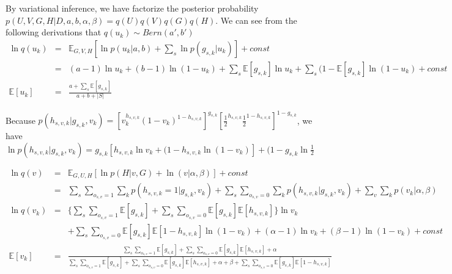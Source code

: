 \documentclass[11pt]{report}
\newcommand{\Ep}{\mathbb{E}}
\begin{document}
By variational inference, we have factorize the posterior probability $p(U,V,G,H|D,a,b,\alpha,\beta )=q(U)q(V)q(G)q(H)$. We can see from the following derivations that $q(u_k)\sim Bern(a',b')$
\begin{eqnarray*}
\ln q(u_k) & = & \mathbb{E}_{G,V,H} [\ln p(u_k|a,b)+\sum_s \ln p(g_{s,k}|u_k)]+const\\
&=&(a-1)\ln u_k +(b-1) \ln (1-u_k) + \sum_{s} \mathbb{E}[g_{s,k}] \ln u_k + \sum_s (1-\mathbb{E}[g_{s,k}] \ln (1-u_k) + const \\
\mathbb{E}[u_k] &=& \frac{a+\sum_{s} \mathbb{E}[g_{s,k}] }{a+b+ |S|  }
\end{eqnarray*}

Because $p(h_{s,v,k}|g_{s,k},v_k)=[v_k^{h_{s,v,k}} (1-v_k)^{1-h_{s,v,k}}]^{g_{s,k}} [\frac{1}{2}^{h_{s,v,k}} \frac{1}{2}^{1-h_{s,v,k}}]^{1-g_{s,k}}$, we have $\ln p(h_{s,v,k}|g_{s,k},v_k)= g_{s,k} [h_{s,v,k}\ln v_k + (1-h_{s,v,k}\ln (1-v_k)] + (1-g_{s,k}\ln\frac{1}{2}$

\begin{eqnarray*}
\ln q(v) & = & \mathbb{E}_{G,U,H} [\ln p(H|v,G)+\ln(v|\alpha,\beta) ] + const\\
&=& \sum_s\sum_{o_{s,v}=1} \sum_k p(h_{s,v,k}=1|g_{s,k},v_k) + \sum_s\sum_{o_{s,v}=0} \sum_k p(h_{s,v,k}|g_{s,k},v_k) +  \sum_v \sum_k p(v_k|\alpha,\beta) \\
\ln q(v_k) & = & \{\sum_s\sum_{o_{s,v}=1}  \mathbb{E}[g_{s,k}] + \sum_s\sum_{o_{s,v}=0}  \Ep[g_{s,k}]\Ep[h_{s,v,k}]\} \ln v_k \\
& & + \sum_s\sum_{o_{s,v}=0} \Ep[g_{s,k}]\Ep[1-h_{s,v,k}] \ln (1-v_k) +  (\alpha-1)\ln v_k + (\beta-1) \ln (1-v_k) + const \\
\Ep[v_k]& = & \frac{\sum_s\sum_{o_{s,v}=1}  \mathbb{E}[g_{s,k}] + \sum_s\sum_{o_{s,v}=0}  \Ep[g_{s,k}]\Ep[h_{s,v,k}]+\alpha}{\sum_s\sum_{o_{s,v}=1}  \mathbb{E}[g_{s,k}] + \sum_s\sum_{o_{s,v}=0}  \Ep[g_{s,k}]\Ep[h_{s,v,k}]+\alpha+\beta + \sum_s\sum_{o_{s,v}=0} \Ep[g_{s,k}]\Ep[1-h_{s,v,k}]}
\end{eqnarray*}
\end{document}
